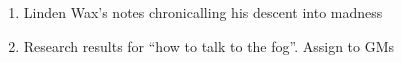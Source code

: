 \documentclass[green]{gl2018}
\begin{document}
\name{\gGMToDo{}}

\begin{enumerate}
\item Linden Wax's notes chronicalling his descent into madness
\item Research results for ``how to talk to the fog''. Assign to GMs
\end{enumerate}
\end{document}

